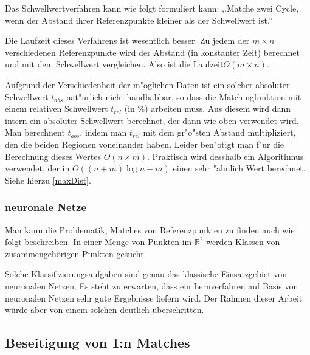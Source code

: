 Das Schwellwertverfahren kann wie folgt formuliert kann: ,,Matche zwei Cycle, wenn der Abstand ihrer Referenzpunkte kleiner als der Schwellwert ist.''

Die Laufzeit dieses Verfahrens ist wesentlich besser. Zu jedem der $m\times n$ verschiedenen  Referenzpunkte wird der  Abstand (in konstanter Zeit) berechnet und mit dem Schwellwert vergleichen. Also ist die Laufzeit$O(m\times n)$.

Aufgrund der Verschiedenheit der m"oglichen Daten ist ein solcher absoluter Schwellwert $t_{abs}$ nat"urlich nicht handhabbar, so dass die Matchingfunktion mit einem relativen Schwellwert $t_{rel}$ (in \%) arbeiten muss. Aus diesem wird dann intern ein absoluter Schwellwert berechnet, der dann wie oben verwendet wird. Man berechnent $t_{abs}$, indem man $t_{rel}$ mit dem gr"o"sten Abstand multipliziert, den die beiden Regionen voneinander haben. Leider ben"otigt man f"ur die Berechnung dieses Wertes $O(n\times m)$. Praktisch wird desshalb ein Algorithmus verwendet, der in $O((n+m)\log{n+m})$ einen sehr "ahnlich Wert berechnet. Siehe hierzu \ref{maxDist}.

\subsubsection*{neuronale Netze}

Man kann die Problematik, Matches von Referenzpunkten zu finden auch wie folgt beschreiben. In einer Menge von Punkten im $\mathbb{R}^2$ werden Klassen von zusammengehörigen Punkten gesucht.

Solche Klassifizierungsaufgaben sind genau das klassische Einsatzgebiet von neuronalen Netzen. Es steht zu erwarten, dass ein Lernverfahren auf Basis von neuronalen Netzen sehr gute Ergebnisse liefern wird. Der Rahmen dieser Arbeit würde aber von einem solchen deutlich überschritten.

\subsection{Beseitigung von 1:n Matches}

